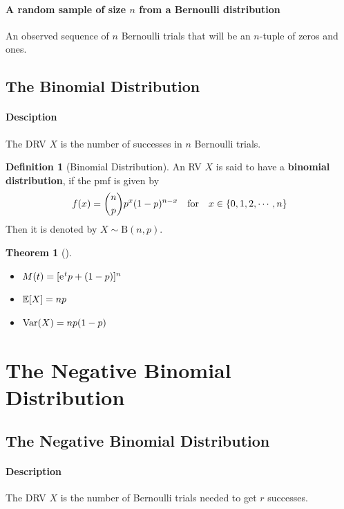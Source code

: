 \documentclass[10pt,UTF8]{article}
\newenvironment{definition box}
{\begin{tcolorbox}[colback=blue!5!white,colframe=blue!75!black,parbox=false,before upper=\par,before lower=\par]}
{\end{tcolorbox}}
\newenvironment{theorem box}
{\begin{tcolorbox}[colback=yellow!5!white,colframe=yellow!75!black,parbox=false,before upper=\par,before lower=\par]}
{\end{tcolorbox}}
\theoremstyle{definition}
\newtheorem{definition inner}{Definition}[section]
\newenvironment{definition}[1][]
{\begin{definition box}\begin{definition inner}[#1]\hfill\par}
{\end{definition inner}\end{definition box}}
\theoremstyle{plain}
\newtheorem{theorem inner}{Theorem}[section]
\newenvironment{theorem}[1][]
{\begin{theorem box}\begin{theorem inner}[#1]\hfill\par}
{\end{theorem inner}\end{theorem box}}
\theoremstyle{definition}
\newtheorem*{proof inner}{\textit{Proof}}
\theoremstyle{remark}
\newcommand{\e}{\mathrm{e}{\mkern 1 mu}}
\newcommand{\E}[1]{\mathbb{E}\qty[#1]}  %
\newcommand{\Var}[1]{\mathrm{Var}\qty(#1)}  %
\begin{document}
\paragraph{
    A random sample of size $n$ from a Bernoulli distribution
}
An observed sequence of $n$ Bernoulli trials that will be an $n$-tuple of zeros
and ones.


\subsection{The Binomial Distribution}

\paragraph{Desciption}
The DRV $X$ is the number of successes in $n$ Bernoulli trials.

\begin{definition}[Binomial Distribution]
    An RV $X$ is said to have a \textbf{binomial distribution},
    if the pmf is given by
    \begin{equation*}
        f(x) = \binom{n}{p}p^x (1-p)^{n-x} \qfor x\in\{0,1,2,\cdots,n\}
    \end{equation*}
    Then it is denoted by $X \sim \mathrm{B}(n,p)$.
\end{definition}

\begin{theorem}
    \begin{itemize}
        \item $M(t) = [\e^t p + (1-p)]^n$
        \item $\E{X} = n p$
        \item $\Var{X} = n p(1-p)$
    \end{itemize}
\end{theorem}


\section{The Negative Binomial Distribution}

\subsection{The Negative Binomial Distribution}

\paragraph{Description}
The DRV $X$ is the number of Bernoulli trials needed to get $r$ successes.
\end{document}
